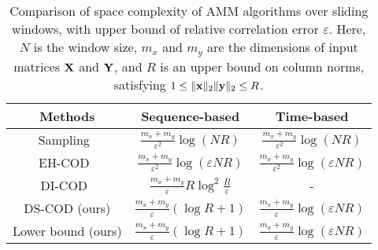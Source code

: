 \begin{table}[t]
    \belowrulesep=0pt
    \aboverulesep=0pt
    \centering
    \renewcommand{\arraystretch}{1.5} 
    \caption{Comparison of space complexity of AMM algorithms over sliding windows, with upper bound of relative correlation error $\varepsilon$. Here, $N$ is the window size, $m_x$ and $m_y$ are the dimensions of input matrices ${\bf X}$ and ${\bf Y}$, and $R$ is an upper bound on column norms, satisfying $1 \leq \|{\bf{x}}\|_2\|{\bf{y}}\|_2 \leq R$.}
    \label{table:comparison}
    \begin{tabular}{|c|c|c|}
        \toprule  
        Methods & Sequence-based & Time-based \\ \hline
        Sampling~\cite{yao2024approximate} & $\frac{m_{x}+m_{y}}{\varepsilon^2} \log (NR)$ & $\frac{m_{x}+m_{y}}{\varepsilon^2} \log (NR)$ \\ 
        EH-COD~\cite{yao2024approximate} & $\frac{m_{x}+m_{y}}{\varepsilon^2} \log (\varepsilon NR)$ & $\frac{m_{x}+m_{y}}{\varepsilon^2} \log (\varepsilon NR)$ \\ 
        DI-COD~\cite{yao2024approximate} & $\frac{m_{x}+m_{y}}{\varepsilon} R \log^2{\frac{R}{\varepsilon}}$ & - \\ 
        \hline
        DS-COD (ours) & $\frac{m_{x}+m_{y}}{\varepsilon} (\log R+1)$ & $\frac{m_{x}+m_{y}}{\varepsilon} \log (\varepsilon NR)$ \\ 
        Lower bound (ours) & $\frac{m_{x}+m_{y}}{\varepsilon} (\log R+1)$ & $\frac{m_{x}+m_{y}}{\varepsilon} \log (\varepsilon NR)$ \\
        \bottomrule
    \end{tabular}
\end{table}



